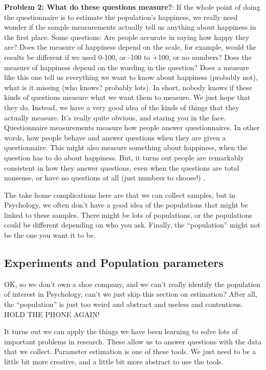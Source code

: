 \documentclass[]{book}
\begin{document}
\textbf{Problem 2: What do these questions measure?}: If the whole point of doing the questionnaire is to estimate the population's happiness, we really need wonder if the sample measurements actually tell us anything about happiness in the first place. Some questions: Are people accurate in saying how happy they are? Does the measure of happiness depend on the scale, for example, would the results be different if we used 0-100, or -100 to +100, or no numbers? Does the measure of happiness depend on the wording in the question? Does a measure like this one tell us everything we want to know about happiness (probably not), what is it missing (who knows? probably lots). In short, nobody knows if these kinds of questions measure what we want them to measure. We just hope that they do. Instead, we have a very good idea of the kinds of things that they actually measure. It's really quite obvious, and staring you in the face. Questionnaire measurements measure how people answer questionnaires. In other words, how people behave and answer questions when they are given a questionnaire. This might also measure something about happiness, when the question has to do about happiness. But, it turns out people are remarkably consistent in how they answer questions, even when the questions are total nonsense, or have no questions at all (just numbers to choose!) \citet{maul_rethinking_2017}.

The take home complications here are that we can collect samples, but in Psychology, we often don't have a good idea of the populations that might be linked to these samples. There might be lots of populations, or the populations could be different depending on who you ask. Finally, the ``population'' might not be the one you want it to be.

\hypertarget{experiments-and-population-parameters}{%
\subsection{Experiments and Population parameters}\label{experiments-and-population-parameters}}

OK, so we don't own a shoe company, and we can't really identify the population of interest in Psychology, can't we just skip this section on estimation? After all, the ``population'' is just too weird and abstract and useless and contentious. HOLD THE PHONE AGAIN!

It turns out we can apply the things we have been learning to solve lots of important problems in research. These allow us to answer questions with the data that we collect. Parameter estimation is one of these tools. We just need to be a little bit more creative, and a little bit more abstract to use the tools.
\end{document}
